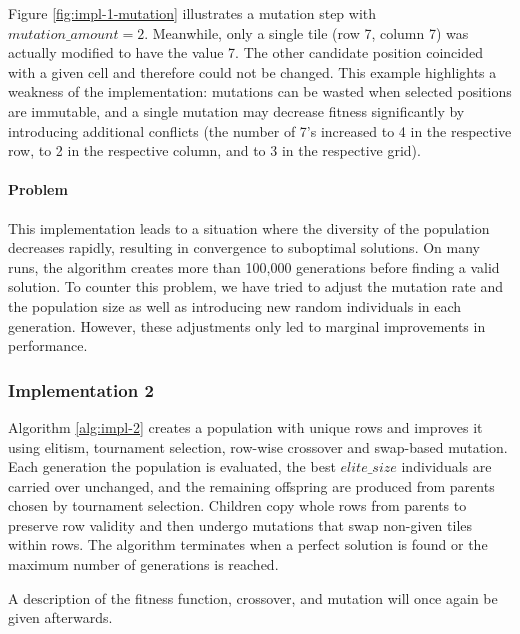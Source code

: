 Figure \ref{fig:impl-1-mutation} illustrates a mutation step with $mutation\_amount =2$. Meanwhile, only a single tile (row 7, column 7) was actually modified to have the value 7. The other candidate position coincided with a given cell and therefore could not be changed. This example highlights a weakness of the implementation: mutations can be wasted when selected positions are immutable, and a single mutation may decrease fitness significantly by introducing additional conflicts (the number of 7's increased to 4 in the respective row, to 2 in the respective column, and to 3 in the respective grid).

\paragraph{Problem}
This implementation leads to a situation where the diversity of the population decreases rapidly, resulting in convergence to suboptimal solutions. On many runs, the algorithm creates more than 100,000 generations before finding a valid solution.  
To counter this problem, we have tried to adjust the mutation rate and the population size as well as introducing new random individuals in each generation. However, these adjustments only led to marginal improvements in performance.

\subsubsection{Implementation 2}
\label{sec:impl-2}
Algorithm \ref{alg:impl-2} creates a population with unique rows and improves it using elitism, tournament selection, row-wise crossover and swap-based mutation. Each generation the population is evaluated, the best \(elite\_size\) individuals are carried over unchanged, and the remaining offspring are produced from parents chosen by tournament selection. Children copy whole rows from parents to preserve row validity and then undergo mutations that swap non-given tiles within rows. The algorithm terminates when a perfect solution is found or the maximum number of generations is reached.

A description of the fitness function, crossover, and mutation will once again be given afterwards.


